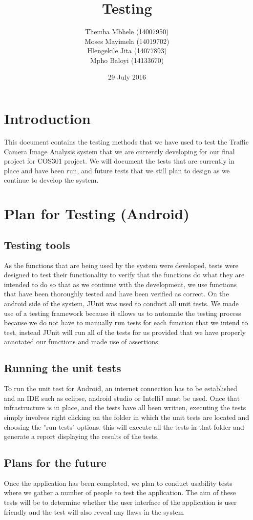 \documentclass{article}
\title{Testing}
\author{Themba Mbhele (14007950)\\
        Moses Mayimela (14019702)\\
        Hlengekile Jita (14077893)\\
        Mpho Baloyi (14133670)\\
        }
\date{29 July 2016}
\begin{document}
\maketitle

\section{Introduction}
This document contains the testing methods that we have used to test the Traffic Camera Image Analysis system that we are currently developing for our final project for COS301 project. We will document the tests that are currently in place and have been run, and future tests that we still plan to design as we continue to develop the system.

\section{Plan for Testing (Android)}
\subsection{Testing tools}
As the functions that are being used by the system were developed, tests were designed to test their functionality to verify that the functions do what they are intended to do so that as we continue with the development, we use functions that have been thoroughly tested and have been verified as correct.
On the android side of the system, JUnit was used to conduct all unit tests. We
made use of a testing framework because it allows us to automate the testing process because we do not have to manually run tests for each function that we intend to test, instead JUnit will run all of the tests for us provided that we
have properly annotated our functions and made use of assertions.
\subsection{Running the unit tests}
To run the unit test for Android, an internet connection has to be established and an IDE such as eclipse, android studio or IntelliJ must be used. Once that infrastructure is in place, and the tests have all been written, executing the tests simply involves right clicking on the folder in which the unit tests are located and choosing the "run tests" options. this will execute all the tests in that folder and generate a report displaying the results of the tests.
\subsection{Plans for the future}
Once the application has been completed, we plan to conduct usability tests where we gather a number of people to test the application. The aim of these tests will be to determine whether the user interface of the application is user friendly and the test will also reveal any flaws in the system
\end{document}
